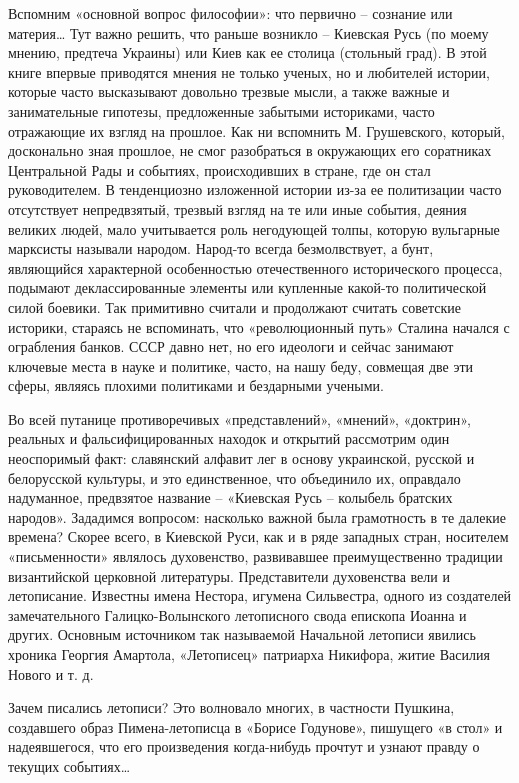 Вспомним «основной вопрос философии»: что первично – сознание или материя… Тут
важно решить, что раньше возникло – Киевская Русь (по моему мнению, предтеча
Украины) или Киев как ее столица (стольный град). В этой книге впервые
приводятся мнения не только ученых, но и любителей истории, которые часто
высказывают довольно трезвые мысли, а также важные и занимательные гипотезы,
предложенные забытыми историками, часто отражающие их взгляд на прошлое. Как ни
вспомнить М. Грушевского, который, досконально зная прошлое, не смог
разобраться в окружающих его соратниках Центральной Рады и событиях,
происходивших в стране, где он стал руководителем. В тенденциозно изложенной
истории из-за ее политизации часто отсутствует непредвзятый, трезвый взгляд на
те или иные события, деяния великих людей, мало учитывается роль негодующей
толпы, которую вульгарные марксисты называли народом. Народ-то всегда
безмолвствует, а бунт, являющийся характерной особенностью отечественного
исторического процесса, подымают деклассированные элементы или купленные
какой-то политической силой боевики. Так примитивно считали и продолжают
считать советские историки, стараясь не вспоминать, что «революционный путь»
Сталина начался с ограбления банков. СССР давно нет, но его идеологи и сейчас
занимают ключевые места в науке и политике, часто, на нашу беду, совмещая две
эти сферы, являясь плохими политиками и бездарными учеными.

Во всей путанице противоречивых «представлений», «мнений», «доктрин», реальных
и фальсифицированных находок и открытий рассмотрим один неоспоримый факт:
славянский алфавит лег в основу украинской, русской и белорусской культуры, и
это единственное, что объединило их, оправдало надуманное, предвзятое название
– «Киевская Русь – колыбель братских народов». Зададимся вопросом: насколько
важной была грамотность в те далекие времена? Скорее всего, в Киевской Руси,
как и в ряде западных стран, носителем «письменности» являлось духовенство,
развивавшее преимущественно традиции византийской церковной литературы.
Представители духовенства вели и летописание. Известны имена Нестора, игумена
Сильвестра, одного из создателей замечательного Галицко-Волынского летописного
свода епископа Иоанна и других. Основным источником так называемой Начальной
летописи явились хроника Георгия Амартола, «Летописец» патриарха Никифора,
житие Василия Нового и т. д.

Зачем писались летописи? Это волновало многих, в частности Пушкина, создавшего
образ Пимена-летописца в «Борисе Годунове», пишущего «в стол» и надеявшегося,
что его произведения когда-нибудь прочтут и узнают правду о текущих событиях…


